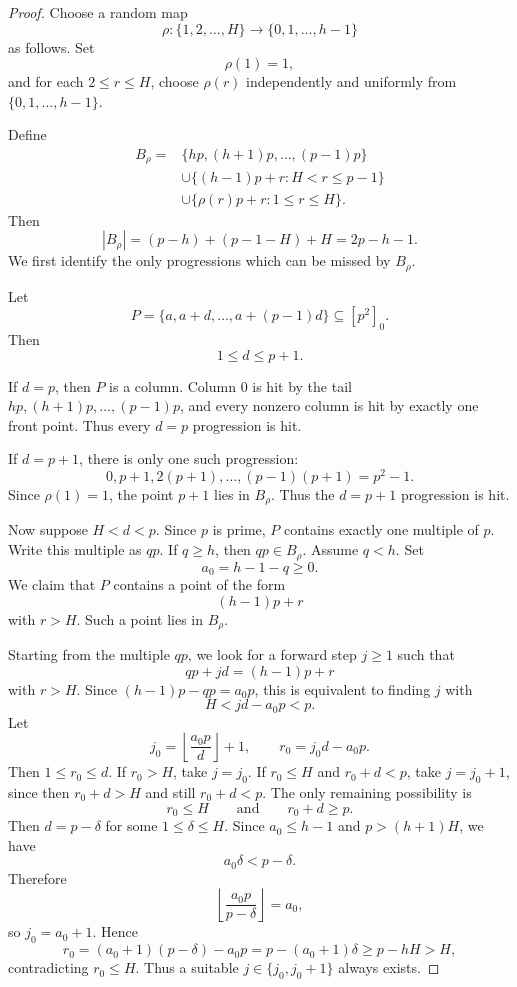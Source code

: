 \documentclass[11pt]{article}
\theoremstyle{remark}
\newcommand{\floor}[1]{\left\lfloor #1\right\rfloor}
\numberwithin{equation}{section}
\begin{document}
\begin{proof}
Choose a random map
\[
        \rho:\{1,2,\ldots,H\}\to\{0,1,\ldots,h-1\}
\]
as follows.
Set
\[
        \rho(1)=1,
\]
and for each $2\le r\le H$, choose $\rho(r)$ independently and uniformly from $\{0,1,\ldots,h-1\}$.

Define
\[
\begin{aligned}
        B_\rho
        ={}&
        \{hp,(h+1)p,\ldots,(p-1)p\} \\
        &\cup
        \{(h-1)p+r:H<r\le p-1\} \\
        &\cup
        \{\rho(r)p+r:1\le r\le H\}.
\end{aligned}
\]
Then
\begin{equation}\label{eq:front-size}
        |B_\rho|=(p-h)+(p-1-H)+H=2p-h-1.
\end{equation}
We first identify the only progressions which can be missed by $B_\rho$.

Let
\[
        P=\{a,a+d,\ldots,a+(p-1)d\}\subseteq[p^2]_0.
\]
Then
\[
        1\le d\le p+1.
\]

If $d=p$, then $P$ is a column.
Column $0$ is hit by the tail $hp,(h+1)p,\ldots,(p-1)p$, and every nonzero column is hit by exactly one front point.
Thus every $d=p$ progression is hit.

If $d=p+1$, there is only one such progression:
\[
        0,
        p+1,
        2(p+1),
        \ldots,
        (p-1)(p+1)=p^2-1.
\]
Since $\rho(1)=1$, the point $p+1$ lies in $B_\rho$.
Thus the $d=p+1$ progression is hit.

Now suppose $H<d<p$.
Since $p$ is prime, $P$ contains exactly one multiple of $p$.
Write this multiple as $qp$.
If $q\ge h$, then $qp\in B_\rho$.
Assume $q<h$.
Set
\[
        a_0=h-1-q\ge0.
\]
We claim that $P$ contains a point of the form
\[
        (h-1)p+r
\]
with $r>H$.
Such a point lies in $B_\rho$.

Starting from the multiple $qp$, we look for a forward step $j\ge1$ such that
\[
        qp+jd=(h-1)p+r
\]
with $r>H$.
Since $(h-1)p-qp=a_0p$, this is equivalent to finding $j$ with
\[
        H<jd-a_0p<p.
\]
Let
\[
        j_0=\floor{\frac{a_0p}{d}}+1,
        \qquad
        r_0=j_0d-a_0p.
\]
Then $1\le r_0\le d$.
If $r_0>H$, take $j=j_0$.
If $r_0\le H$ and $r_0+d<p$, take $j=j_0+1$, since then $r_0+d>H$ and still $r_0+d<p$.
The only remaining possibility is
\[
        r_0\le H
        \qquad\text{and}\qquad
        r_0+d\ge p.
\]
Then $d=p-\delta$ for some $1\le\delta\le H$.
Since $a_0\le h-1$ and $p>(h+1)H$, we have
\[
        a_0\delta<p-\delta.
\]
Therefore
\[
        \floor{\frac{a_0p}{p-\delta}}=a_0,
\]
so $j_0=a_0+1$.
Hence
\[
        r_0=(a_0+1)(p-\delta)-a_0p
        =p-(a_0+1)\delta
        \ge p-hH>H,
\]
contradicting $r_0\le H$.
Thus a suitable $j\in\{j_0,j_0+1\}$ always exists.


\end{proof}
\end{document}
